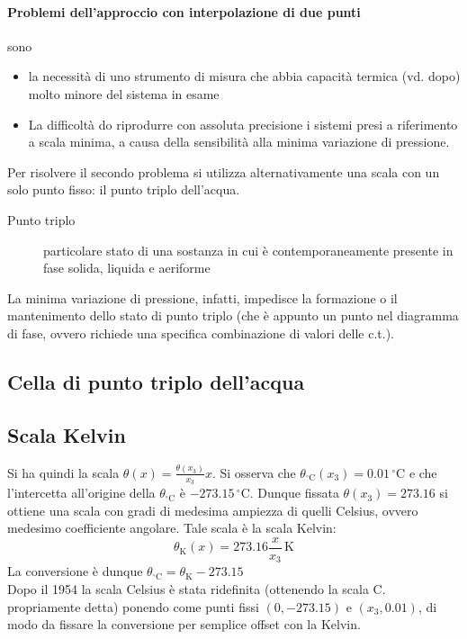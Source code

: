 \documentclass[10pt, oneside]{book}
\begin{document}
\paragraph{Problemi dell'approccio con interpolazione di due punti} sono 
\begin{itemize}
\item la necessità di uno strumento di misura che abbia capacità termica (vd. dopo) molto minore del sistema in esame
\item La difficoltà do riprodurre con assoluta precisione i sistemi presi a riferimento a scala minima, a causa della sensibilità alla minima variazione di pressione.
\end{itemize}
Per risolvere il secondo problema si utilizza alternativamente una scala con un solo punto fisso: il punto triplo dell'acqua.
\begin{description}
\item[Punto triplo] particolare stato di una sostanza in cui è contemporaneamente presente in fase solida, liquida e aeriforme
\end{description}
La minima variazione di pressione, infatti, impedisce la formazione o il mantenimento dello stato di punto triplo (che è appunto un punto nel diagramma di fase, ovvero richiede una specifica combinazione di valori delle c.t.).
\subsection{Cella di punto triplo dell'acqua}

\subsection{Scala Kelvin}
Si ha quindi la scala $\displaystyle \theta(x) = \frac{\theta(x_3)}{x_3} x$. Si osserva che $\theta_{\mathrm{{}^\circ C}} (x_3) = 0.01 \, \mathrm{{}^\circ C}$ e che l'intercetta all'origine della $\displaystyle \theta_{\mathrm{{}^\circ C}}$ è $\displaystyle -273.15 \, \mathrm{{}^\circ C}$. Dunque fissata $ \theta(x_3) = 273.16$ si ottiene una scala con gradi di medesima ampiezza di quelli Celsius, ovvero medesimo coefficiente angolare. Tale scala è la scala Kelvin:
\[\theta_{\mathrm{K}} (x) = 273.16\frac{x}{x_3} \, \mathrm{K}\]
La conversione è dunque $\displaystyle \theta_{\mathrm{{}^\circ C}} = \theta_{\mathrm{K}} - 273.15$
\\Dopo il 1954 la scala Celsius è stata ridefinita (ottenendo la scala C. propriamente detta) ponendo come punti fissi $(0, -273.15)$ e $(x_3, 0.01)$, di modo da fissare la conversione per semplice offset con la Kelvin.
\end{document}

